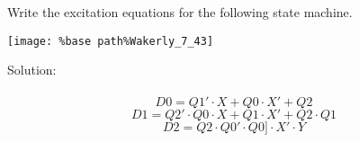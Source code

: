 Write the excitation equations for the following state machine.
\begin{center}
  \texttt{[image: \%base path\%Wakerly\_7\_43]}
\end{center}

Solution: \\ \\
$$D0 = Q1' \cdot X + Q0 \cdot X' + Q2$$
$$D1 = Q2' \cdot Q0 \cdot X + Q1 \cdot X' + Q2 \cdot Q1$$
$$D2 = Q2 \cdot Q0' \cdot Q0] \cdot X' \cdot Y$$
